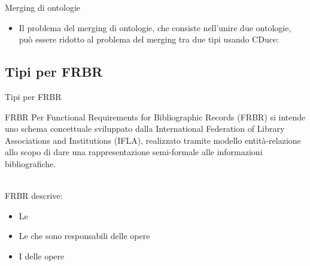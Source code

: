 \begin{frame}{Merging di ontologie}
    \begin{itemize}
        \item Il problema del merging di ontologie, che consiste nell'unire due ontologie, può essere ridotto al problema del merging tra due tipi usando CDuce:
    \end{itemize}
    
        
\end{frame}

\subsection{Tipi per FRBR}
\begin{frame}{Tipi per FRBR}
    \begin{block}{FRBR}
    Per Functional Requirements for Bibliographic Records (FRBR) si intende uno
    schema concettuale sviluppato dalla International Federation of Library Associations
    and Institutions (IFLA), realizzato tramite modello entità-relazione allo scopo di dare
    una rappresentazione semi-formale alle informazioni bibliografiche.
    \end{block}
    ~\\
    FRBR descrive:
    \begin{itemize}
        \item Le 
        \item Le  che sono responsabili delle opere
        \item I  delle opere
    \end{itemize}
\end{frame}

